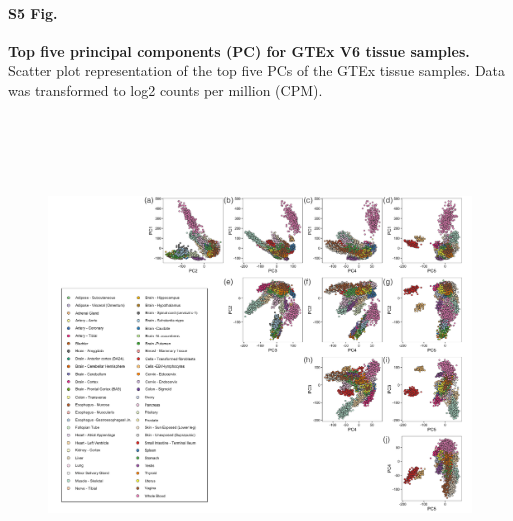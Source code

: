\documentclass[10pt,letterpaper]{article}
\begin{document}
\paragraph*{S5 Fig.}

\label{figS5}
{\bf Top five principal components (PC) for GTEx V6 tissue samples.} Scatter plot representation of the top five PCs of the GTEx tissue samples. Data was transformed to log2 counts per million (CPM).
\begin{figure}[ht]
\centering
\includegraphics[height=5in, width=6in]{../../plots/gtex-figures/gtex-high-pcs.pdf}
\end{figure}
\end{document}
